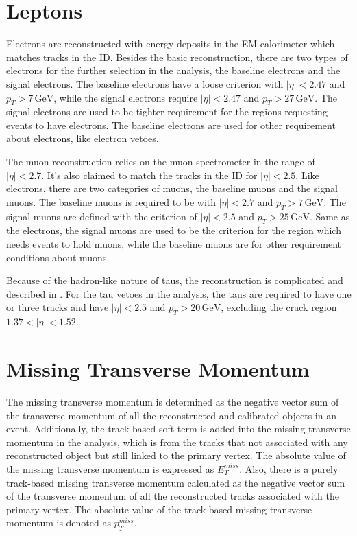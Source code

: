 \documentclass[class=NTHU_thesis, crop=false]{standalone}
\begin{document}
\section{Leptons}
Electrons are reconstructed with energy deposits in the EM calorimeter which matches tracks in the ID. Besides the basic reconstruction, there are two types of electrons for the further selection in the analysis, the baseline electrons and the signal electrons. The baseline electrons have a loose criterion with $\left|\eta\right| < 2.47$ and $p_T > 7\, \mathrm{GeV}$, while the signal electrons require $\left|\eta\right| < 2.47$ and $p_T > 27\, \mathrm{GeV}$. The signal electrons are used to be tighter requirement for the regions requesting events to have electrons. The baseline electrons are used for other requirement about electrons, like electron vetoes.

The muon reconstruction relies on the muon spectrometer in the range of $\left|\eta\right| < 2.7$. It's also claimed to match the tracks in the ID for $\left|\eta\right| < 2.5$. Like electrons, there are two categories of muons, the baseline muons and the signal muons. The baseline muons is required to be with $\left|\eta\right| < 2.7$ and $p_T > 7\, \mathrm{GeV}$. The signal muons are defined with the criterion of $\left|\eta\right| < 2.5$ and $p_T > 25\, \mathrm{GeV}$. Same as the electrons, the signal muons are used to be the criterion for the region which needs events to hold muons, while the baseline muons are for other requirement conditions about muons.

Because of the hadron-like nature of taus, the reconstruction is complicated and described in \cite{ATLAS-CONF-2017-029}. For the tau vetoes in the analysis, the taus are required to have one or three tracks and have $\left|\eta\right| < 2.5$ and $p_T > 20\, \mathrm{GeV}$, excluding the crack region $1.37 < \left|\eta\right| < 1.52$.

\section{Missing Transverse Momentum}
The missing transverse momentum is determined as the negative vector sum of the transverse momentum of all the reconstructed and calibrated objects in an event. Additionally, the track-based soft term is added into the missing transverse momentum in the analysis, which is from the tracks that not associated with any reconstructed object but still linked to the primary vertex. The absolute value of the missing transverse momentum is expressed as $E^{miss}_T$. Also, there is a purely track-based missing transverse momentum calculated as the negative vector sum of the transverse momentum of all the reconstructed tracks associated with the primary vertex. The absolute value of the track-based missing transverse momentum is denoted as $p^{miss}_T$.
\end{document}

